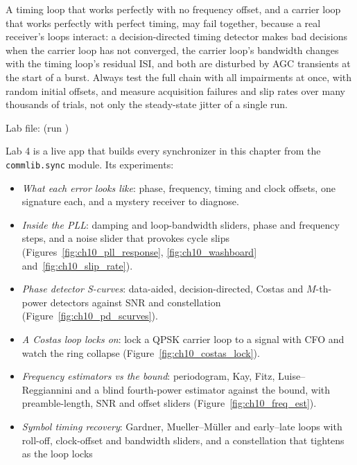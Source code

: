 \begin{pitfall}
A timing loop that works perfectly with no frequency offset, and a carrier loop that works perfectly
with perfect timing, may fail together, because a real receiver's loops interact: a decision-directed
timing detector makes bad decisions when the carrier loop has not converged, the carrier loop's
bandwidth changes with the timing loop's residual ISI, and both are disturbed by AGC transients at the
start of a burst. Always test the full chain with all impairments at once, with random initial
offsets, and measure acquisition failures and slip rates over many thousands of trials, not only the
steady-state jitter of a single run.
\end{pitfall}

\begin{labbox}
{\raggedright Lab file: 
(run )\par}
\smallskip
\noindent Lab 4 is a live app that builds every synchronizer in this chapter from the
\texttt{commlib.sync} module. Its experiments:
\begin{itemize}
\item \emph{What each error looks like}: phase, frequency, timing and clock offsets, one signature
each, and a mystery receiver to diagnose.
\item \emph{Inside the PLL}: damping and loop-bandwidth sliders, phase and frequency steps, and a
noise slider that provokes cycle slips (Figures~\ref{fig:ch10_pll_response},
\ref{fig:ch10_washboard} and~\ref{fig:ch10_slip_rate}).
\item \emph{Phase detector S-curves}: data-aided, decision-directed, Costas and $M$-th-power detectors
against SNR and constellation (Figure~\ref{fig:ch10_pd_scurves}).
\item \emph{A Costas loop locks on}: lock a QPSK carrier loop to a signal with CFO and watch the ring
collapse (Figure~\ref{fig:ch10_costas_lock}).
\item \emph{Frequency estimators vs the bound}: periodogram, Kay, Fitz, Luise--Reggiannini and a blind
fourth-power estimator against the bound, with preamble-length, SNR and offset sliders
(Figure~\ref{fig:ch10_freq_est}).
\item \emph{Symbol timing recovery}: Gardner, Mueller--M\"uller and early--late loops with roll-off,
clock-offset and bandwidth sliders, and a constellation that tightens as the loop locks

\end{itemize}
\end{labbox}
